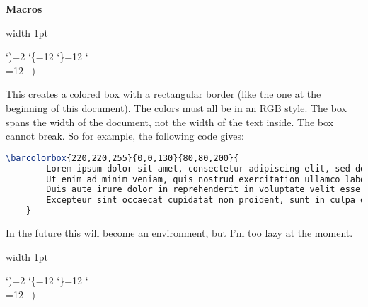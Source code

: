 \documentclass[10pt]{article}
\def\ppsection#1{\begin{blankpp} {\bfseries\Large #1} \end{blankpp}}
\def\showcase{\medskip\bgroup \color{showcasecolor} \leavevmode\vrule width 1pt \strut \aftergroup\medskip \catcode`)=2 \catcode`\{=12 \catcode`\}=12 \catcode`\\=12 \bftt\ \let\next=}
\begin{document}
\ppsection{Macros}

\showcase()

This creates a colored box with a rectangular border (like the one at the beginning of this document).
The colors must all be in an RGB style.
The box spans the width of the document, not the width of the text inside.
The box cannot break.
So for example, the following code gives:

\begin{lstlisting}[language=tex]
	\barcolorbox{220,220,255}{0,0,130}{80,80,200}{
		Lorem ipsum dolor sit amet, consectetur adipiscing elit, sed do eiusmod tempor incididunt ut labore et dolore magna aliqua.
		Ut enim ad minim veniam, quis nostrud exercitation ullamco laboris nisi ut aliquip ex ea commodo consequat.
		Duis aute irure dolor in reprehenderit in voluptate velit esse cillum dolore eu fugiat nulla pariatur.
		Excepteur sint occaecat cupidatat non proident, sunt in culpa qui officia deserunt mollit anim id est laborum.
	}
\end{lstlisting}


In the future this will become an environment, but I'm too lazy at the moment.

\showcase()
\end{document}
